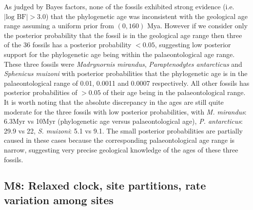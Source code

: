 \documentclass[11pt]{article}
\newcommand{\Mrelaxed}{{M8}}
\begin{document}
As judged by Bayes factors, none of the fossils exhibited strong evidence (i.e. $|\text{log BF}| > 3.0$) that the phylogenetic age was inconsistent with the geological age range assuming a uniform prior from $(0,160)$ Mya. However if we consider only the posterior probability that the fossil is in the geological age range then three of the 36 fossils has a posterior probability $< 0.05$, suggesting low posterior support for the phylogenetic age being within the palaeontological age range. These three fossils were {\em Madrynornis mirandus}, {\em Paraptenodytes antarcticus} and {\em Sphenicus muizoni} with posterior probabilities that the phylogenetic age is in the palaeontological range of 0.01, 0.0011 and 0.0007 respectively. All other fossils has posterior probabilities of $> 0.05$ of their age being in the palaeontological range. It is worth noting that the absolute discrepancy in the ages are still quite moderate for the three fossils with low posterior probabilities, with {\em M. mirandus}: 6.3Myr vs 10Myr (phylogenetic age versus palaeontological age), {\em P. antarcticus}: 29.9 vs 22, {\em S. muizoni}: 5.1 vs 9.1. The small posterior probabilities are partially caused in these cases because the corresponding palaeontological age range is narrow, suggesting very precise geological knowledge of the ages of these three fossils.

\subsection*{\Mrelaxed{}: Relaxed clock, site partitions, rate variation among sites}
\end{document}
